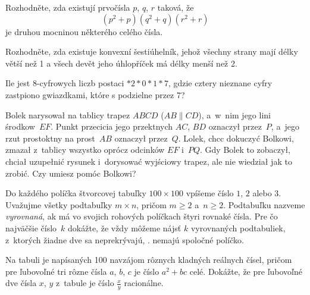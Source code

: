 {%
Rozhodněte, zda existují prvočísla $p$, $q$, $r$ taková, že
$$(p^2+p)(q^2+q)(r^2+r)$$
je druhou mocninou některého celého čísla.}

{%
Rozhodněte, zda existuje konvexní šestiúhelník, jehož všechny strany mají délky větší než 1 a všech devět jeho úhlopříček má délky menší než 2.}

{%
Ile jest 8-cyfrowych liczb postaci ${*}2{*}0{*}1{*}7$, gdzie cztery nieznane cyfry zast\ą{}piono gwiazdkami, które s\ą{} podzielne przez $7$?}

{%
Bolek narysowa\l{} na tablicy trapez $ABCD$ ($AB\parallel CD$), a~w~nim jego lini\ę{} środkow\ą{}~$EF$. Punkt przeci\ę{}cia jego przek\ą{}tnych $AC$, $BD$ oznaczy\l{} przez~$P$, a~jego rzut prostok\ą{}tny na prost\ą{}~$AB$ oznaczy\l{} przez~$Q$. Lolek, chc\ą{}c dokuczyć Bolkowi, zmaza\l{} z~tablicy wszystko oprócz odcinków $EF$ i~$PQ$. Gdy Bolek to zobaczy\l{}, chcia\l{} uzupe\l{}nić rysunek i~dorysować wyjściowy trapez, ale nie wiedzia\l{} jak to zrobić. Czy umiesz pomóc Bolkowi?}

{%
Do každého políčka štvorcovej tabuľky $100\times 100$ vpíšeme číslo $1$, $2$ alebo $3$. Uvažujme všetky podtabuľky $m\times n$, pričom $m\ge 2$ a~$n\ge 2$. Podtabuľku nazveme {\it vyrovnaná}, ak má vo svojich rohových políčkach štyri rovnaké čísla. Pre čo najväčšie číslo~$k$ dokážte, že vždy môžeme nájsť $k$ vyrovnaných podtabuliek, z~ktorých žiadne dve sa neprekrývajú, \tj. nemajú spoločné políčko.}

{%
Na tabuli je napísaných 100 navzájom rôznych kladných reálnych čísel, pričom pre ľubovoľné tri rôzne čísla $a$, $b$, $c$ je číslo $a^2+bc$ celé. Dokážte, že pre ľubovoľné dve čísla $x$, $y$ z~tabule je číslo $\frac xy$ racionálne.}
